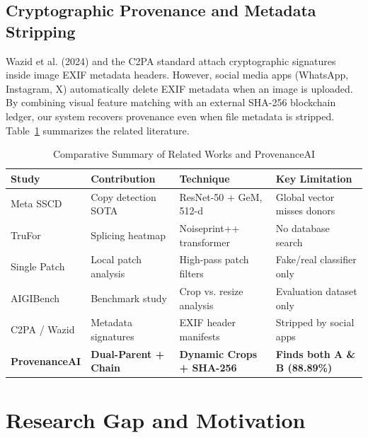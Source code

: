 \documentclass[12pt,a4paper]{article}
\begin{document}
\subsection{Cryptographic Provenance and Metadata Stripping}
Wazid et al. (2024) \cite{wazid} and the C2PA standard \cite{c2pa} attach cryptographic signatures inside image EXIF metadata headers. However, social media apps (WhatsApp, Instagram, X) automatically delete EXIF metadata when an image is uploaded. By combining visual feature matching with an external SHA-256 blockchain ledger, our system recovers provenance even when file metadata is stripped. Table~\ref{tab:literature} summarizes the related literature.

\begin{table}[h]
\centering
\small
\begin{tabular}{p{3.0cm} p{3.6cm} p{3.5cm} p{3.8cm}}
\toprule
\textbf{Study} & \textbf{Contribution} & \textbf{Technique} & \textbf{Key Limitation} \\
\midrule
Meta SSCD \cite{sscd} & Copy detection SOTA & ResNet-50 + GeM, 512-d & Global vector misses donors \\
TruFor \cite{trufor} & Splicing heatmap & Noiseprint++ transformer & No database search \\
Single Patch \cite{singlepatch} & Local patch analysis & High-pass patch filters & Fake/real classifier only \\
AIGIBench \cite{aigibench} & Benchmark study & Crop vs. resize analysis & Evaluation dataset only \\
C2PA / Wazid \cite{wazid} & Metadata signatures & EXIF header manifests & Stripped by social apps \\
\textbf{ProvenanceAI} & \textbf{Dual-Parent + Chain} & \textbf{Dynamic Crops + SHA-256} & \textbf{Finds both A \& B (88.89\%)} \\
\bottomrule
\end{tabular}
\caption{Comparative Summary of Related Works and ProvenanceAI}
\label{tab:literature}
\end{table}

\section{Research Gap and Motivation}
\end{document}
